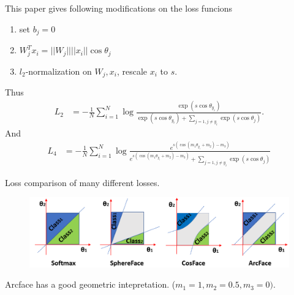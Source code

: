 \documentclass[a4paper]{article}
\begin{document}
        This paper gives following modifications on the loss funcions\:
        \begin{enumerate}[label = \arabic*]
            \item set $b_j = 0$
            \item $W_j^T x_i = ||W_j||||x_i||\cos{\theta_j}$
            \item $l_2$-normalization on $W_j, x_i$, rescale $x_i$ to $s$.
        \end{enumerate}
        Thus 
        \begin{align*}
            L_2 &= -\frac{1}{N} \sum_{i=1}^N \log 
                \frac{\exp{(s\cos\theta_{y_i})}}
                {\exp{(s\cos\theta_{y_i})} + \sum_{j=1, j\neq y_i}\exp{(s\cos\theta_j)}}.
        \end{align*}
        And 
        \begin{align*}
            L_4 &= -\frac{1}{N} \sum_{i=1}^N \log 
                \frac{e^{s(\cos(m_1\theta_{y_i}+m_2)-m_3)}}
                {e^{s(\cos(m_1\theta_{y_i}+m_2)-m_3)} + \sum_{j=1, j\neq y_i}\exp{(s\cos\theta_j)}}
        \end{align*}

        \newpage
        Loss comparison of many different losses.
        \begin{figure}[t]
            \includegraphics*[scale = 0.3]{margincompare.png}
        \end{figure}
        Arcface has a good geometric intepretation. ($m_1 = 1, m_2 = 0.5, m_3 = 0)$.
    \nocite{arcface}
    \printbibliography{}
\end{document}
